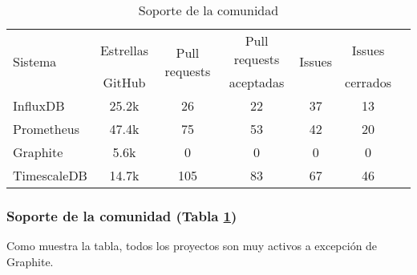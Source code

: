 \begin{table}[H]
    \begin{center}
        \begin{adjustbox}{max width=\textwidth}
            \begin{tabular}{l c c c c c c}
                \toprule
                \multirow{2}{*}{Sistema} & Estrellas & \multirow{2}{*}{Pull requests} & Pull requests & \multirow{2}{*}{Issues}  & Issues \\
                 &  GitHub &  & aceptadas &  &  cerrados \\
                \otoprule
                InfluxDB    & 25.2k & 26 & 22 & 37 & 13 \\
                Prometheus  & 47.4k & 75 & 53 & 42 & 20\\
                Graphite & 5.6k & 0 & 0 & 0 & 0 \\
                TimescaleDB & 14.7k & 105 & 83 & 67 & 46 \\
                \bottomrule
            \end{tabular}
        \end{adjustbox}
        \caption{Soporte de la comunidad}
        \label{tabla:cssgbd}
    \end{center}
\end{table}

\subsubsection{Soporte de la comunidad (Tabla \ref{tabla:cssgbd})} Como muestra la tabla, todos los proyectos son muy
activos a excepción de Graphite.

